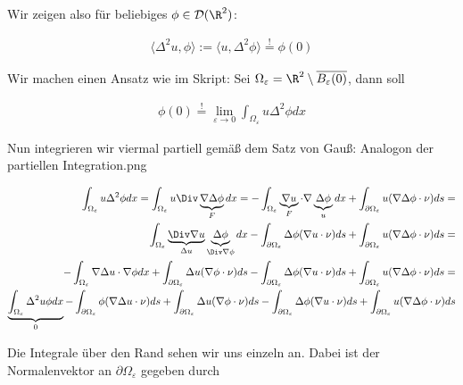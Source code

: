 \begin{solution}

Wir zeigen also für beliebiges $\phi \in \mathcal{D}(\R^2)$:

\begin{align*}
  \langle \Delta^2u, \phi \rangle
  :=
  \langle u, \Delta^2 \phi \rangle
  \stackrel{!}{=}
  \phi(0)
\end{align*}

Wir machen einen Ansatz wie im Skript: Sei $\Omega_\varepsilon = \R^2 \setminus \overline{B_\varepsilon(0)}$, dann soll

\begin{align*}
  \phi(0)
  \stackrel{!}{=}
  \lim_{\varepsilon \rightarrow 0}\int_{\Omega_\varepsilon} u \Delta^2 \phi dx
\end{align*}

Nun integrieren wir viermal partiell gemäß dem Satz von Gauß:
{Analogon der partiellen Integration.png}


\begin{align*}
  \int_{\Omega_\varepsilon} u \Delta^2 \phi dx
  =
  \int_{\Omega_\varepsilon} u \Div\underbrace{\nabla \Delta \phi}_F dx
  =
  -\int_{\Omega_\varepsilon} \underbrace{\nabla u}_{F} \cdot \nabla \underbrace{\Delta \phi}_{u} dx
  +
  \int_{\partial \Omega_\varepsilon} u(\nabla \Delta \phi \cdot \nu) ds
  = \\
  \int_{\Omega_\varepsilon} \underbrace{\Div\nabla u}_{\Delta u} \underbrace{\Delta \phi}_{\Div \nabla \phi} dx
  -
  \int_{\partial \Omega_\varepsilon} \Delta \phi (\nabla u \cdot \nu) ds
  +
  \int_{\partial \Omega_\varepsilon} u(\nabla \Delta \phi \cdot \nu) ds
  = \\
  -\int_{\Omega_\varepsilon} \nabla \Delta u \cdot \nabla \phi dx
  +
  \int_{\partial \Omega_\varepsilon} \Delta u (\nabla \phi \cdot \nu) ds
  -
  \int_{\partial \Omega_\varepsilon} \Delta \phi (\nabla u \cdot \nu) ds
  +
  \int_{\partial \Omega_\varepsilon} u(\nabla \Delta \phi \cdot \nu) ds
  = \\
  \underbrace{\int_{\Omega_\varepsilon} \Delta^2 u \phi dx}_{0}
  -
  \int_{\partial \Omega_\varepsilon} \phi (\nabla \Delta u \cdot \nu) ds
  +
  \int_{\partial \Omega_\varepsilon} \Delta u (\nabla \phi \cdot \nu) ds
  -
  \int_{\partial \Omega_\varepsilon} \Delta \phi (\nabla u \cdot \nu) ds
  +
  \int_{\partial \Omega_\varepsilon} u(\nabla \Delta \phi \cdot \nu) ds
\end{align*}

Die Integrale über den Rand sehen wir uns einzeln an. Dabei ist der Normalenvektor an
$\partial \Omega_\varepsilon$ gegeben durch


\end{solution}
